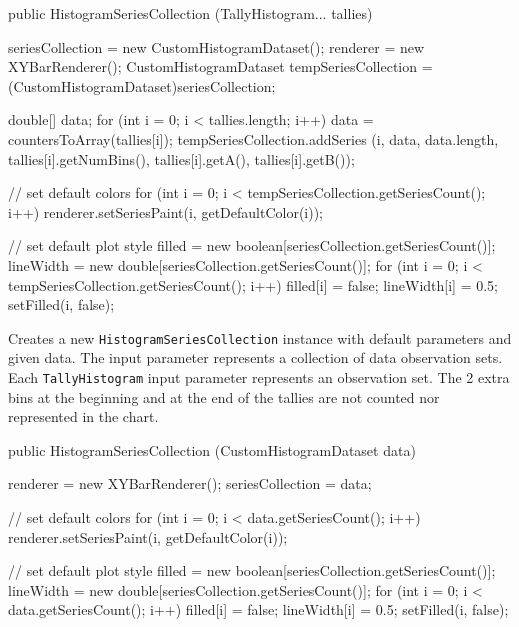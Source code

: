 \begin{code}

   public HistogramSeriesCollection (TallyHistogram... tallies) \begin{hide} {
      seriesCollection = new CustomHistogramDataset();
      renderer = new XYBarRenderer();
      CustomHistogramDataset tempSeriesCollection = (CustomHistogramDataset)seriesCollection;

      double[] data;
      for (int i = 0; i < tallies.length; i++) {
         data = countersToArray(tallies[i]);
         tempSeriesCollection.addSeries (i, data, data.length,
            tallies[i].getNumBins(), tallies[i].getA(), tallies[i].getB());
      }

      // set default colors
      for (int i = 0; i < tempSeriesCollection.getSeriesCount(); i++) {
         renderer.setSeriesPaint(i, getDefaultColor(i));
      }

      // set default plot style
      filled = new boolean[seriesCollection.getSeriesCount()];
      lineWidth = new double[seriesCollection.getSeriesCount()];
      for (int i = 0; i < tempSeriesCollection.getSeriesCount(); i++) {
         filled[i] = false;
         lineWidth[i] = 0.5;
         setFilled(i, false);
      }
   }\end{hide}
\end{code}
\begin{tabb}
   Creates a new \texttt{HistogramSeriesCollection} instance with default
 parameters and given data. The input parameter represents a collection of
 data observation sets. Each \texttt{TallyHistogram} input parameter represents
 an observation set. The 2 extra bins at the beginning and at the end of the
 tallies are not counted nor represented in the chart.
\end{tabb}
\begin{htmlonly}
\end{htmlonly}
\begin{code}

   public HistogramSeriesCollection (CustomHistogramDataset data) \begin{hide} {
      renderer = new XYBarRenderer();
      seriesCollection = data;

      // set default colors
      for (int i = 0; i < data.getSeriesCount(); i++) {
         renderer.setSeriesPaint(i, getDefaultColor(i));
      }

      // set default plot style
      filled = new boolean[seriesCollection.getSeriesCount()];
      lineWidth = new double[seriesCollection.getSeriesCount()];
      for (int i = 0; i < data.getSeriesCount(); i++) {
         filled[i] = false;
         lineWidth[i] = 0.5;
         setFilled(i, false);
      }
   }\end{hide}
\end{code}
